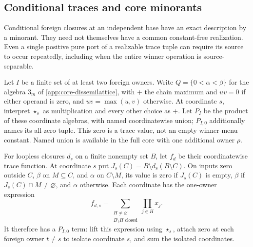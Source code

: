 \subsection{Conditional traces and core minorants}
\label{app:core-conditional-traces}

Conditional foreign closures at an independent base have an exact
description by a minorant. They need not themselves have a common
constant-free realization. Even a single positive pure port of a
realizable trace tuple can require its source to occur repeatedly,
including when the entire winner operation is source-separable.

Let $I$ be a finite set of at least two foreign owners. Write
$Q=\{0<\alpha<\beta\}$ for the algebra $3_m$ of
\cref{app:core-dissemilattice}, with $+$ the chain maximum and
$uv=0$ if either operand is zero, and $uv=\max(u,v)$ otherwise.
At coordinate $s$, interpret $\star_s$ as multiplication and every
other choice as $+$. Let $P_I$ be the product of these coordinate
algebras, with named coordinatewise union; $P_{I,0}$ additionally
names its all-zero tuple. This zero is a trace value, not an empty
winner-menu constant. Named union is available in the full core with
one additional owner $\rho$.

For loopless closures $d_s$ on a finite nonempty set $B$, let $f_d$
be their coordinatewise trace function. At coordinate $s$ put
$J_s(C)=B\setminus d_s(B\setminus C)$. On inputs zero outside $C$,
$\beta$ on $M\subseteq C$, and $\alpha$ on $C\setminus M$, its value
is zero if $J_s(C)$ is empty, $\beta$ if $J_s(C)\cap M\ne\varnothing$,
and $\alpha$ otherwise. Each coordinate has the one-owner expression
\[
 f_{d,s}=\sum_{\substack{H\ne\varnothing\\B\setminus H\text{ closed}}}
                 \prod_{j\in H}x_j.
\]
It therefore has a $P_{I,0}$ term: lift this expression using
$\star_s$, attach zero at each foreign owner $t\ne s$ to isolate
coordinate $s$, and sum the isolated coordinates.

